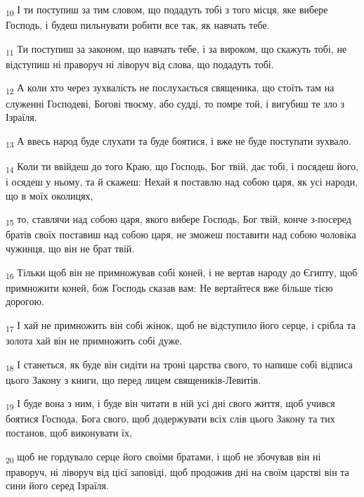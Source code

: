 \begin{tcolorbox}
\textsubscript{10} І ти поступиш за тим словом, що подадуть тобі з того місця, яке вибере Господь, і будеш пильнувати робити все так, як навчать тебе.
\end{tcolorbox}
\begin{tcolorbox}
\textsubscript{11} Ти поступиш за законом, що навчать тебе, і за вироком, що скажуть тобі, не відступиш ні праворуч ні ліворуч від слова, що подадуть тобі.
\end{tcolorbox}
\begin{tcolorbox}
\textsubscript{12} А коли хто через зухвалість не послухається священика, що стоїть там на служенні Господеві, Богові твоєму, або судді, то помре той, і вигубиш те зло з Ізраїля.
\end{tcolorbox}
\begin{tcolorbox}
\textsubscript{13} А ввесь народ буде слухати та буде боятися, і вже не буде поступати зухвало.
\end{tcolorbox}
\begin{tcolorbox}
\textsubscript{14} Коли ти ввійдеш до того Краю, що Господь, Бог твій, дає тобі, і посядеш його, і осядеш у ньому, та й скажеш: Нехай я поставлю над собою царя, як усі народи, що в моїх околицях,
\end{tcolorbox}
\begin{tcolorbox}
\textsubscript{15} то, ставлячи над собою царя, якого вибере Господь, Бог твій, конче з-посеред братів своїх поставиш над собою царя, не зможеш поставити над собою чоловіка чужинця, що він не брат твій.
\end{tcolorbox}
\begin{tcolorbox}
\textsubscript{16} Тільки щоб він не примножував собі коней, і не вертав народу до Єгипту, щоб примножити коней, бож Господь сказав вам: Не вертайтеся вже більше тією дорогою.
\end{tcolorbox}
\begin{tcolorbox}
\textsubscript{17} І хай не примножить він собі жінок, щоб не відступило його серце, і срібла та золота хай він не примножить собі дуже.
\end{tcolorbox}
\begin{tcolorbox}
\textsubscript{18} І станеться, як буде він сидіти на троні царства свого, то напише собі відписа цього Закону з книги, що перед лицем священиків-Левитів.
\end{tcolorbox}
\begin{tcolorbox}
\textsubscript{19} І буде вона з ним, і буде він читати в ній усі дні свого життя, щоб учився боятися Господа, Бога свого, щоб додержувати всіх слів цього Закону та тих постанов, щоб виконувати їх,
\end{tcolorbox}
\begin{tcolorbox}
\textsubscript{20} щоб не гордувало серце його своїми братами, і щоб не збочував він ні праворуч, ні ліворуч від цієї заповіді, щоб продожив дні на своїм царстві він та сини його серед Ізраїля.
\end{tcolorbox}
